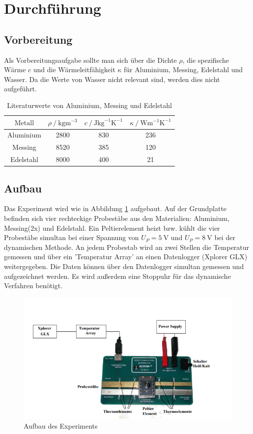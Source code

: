 \section{Durchführung}
\label{sec:Durchführung}
\subsection{Vorbereitung}
Als Vorbereitungsaufgabe sollte man sich über die Dichte $\rho$, die spezifische Wärme $c$ und die Wärmeleitfähigkeit $\kappa$ für 
Aluminium, Messing, Edelstahl und Wasser. Da die Werte von Wasser nicht relevant sind, werden dies nicht aufgeführt.
\begin{table}
    \centering
    \caption{Literaturwerte von Aluminium, Messing und Edelstahl}
    \label{tab:litwerte}
    \begin{tabular}{c c c c}
        \toprule
        $\text{Metall}$ & $\rho \mathbin{/} \si{\kilogram\meter\tothe{-3}}$ 
        & $c \mathbin{/} \si{\joule\kilogram\tothe{-1}\kelvin\tothe{-1}}$ & $\kappa \mathbin{/} \si{\watt\meter\tothe{-1}\kelvin\tothe{-1}}$\\
        \midrule
        Aluminium & 2800 & 830 & 236 \\
        Messing   & 8520 & 385 & 120 \\
        Edelstahl & 8000 & 400 & 21  \\
        \bottomrule
    \end{tabular}
\end{table}
\subsection{Aufbau}
Das Experiment wird wie in Abbildung \ref{fig:aufbau} aufgebaut. Auf der Grundplatte befinden sich vier rechteckige Probestäbe aus den Materialien:
Aluminium, Messing(2x) und Edelstahl. Ein Peltierelement heizt bzw. kühlt die vier Probestäbe simultan bei einer Spannung von $U_P=\SI{5}{\volt}$
und $U_P=\SI{8}{\volt}$ bei der dynamischen Methode. An jedem Probestab wird an zwei Stellen die Temperatur gemessen und über ein 'Temperatur Array'
an einen Datenlogger (Xplorer GLX) weitergegeben. Die Daten können über den Datenlogger simultan gemessen und aufgezeichnet werden. 
Es wird außerdem eine Stoppuhr für das dynamische Verfahren benötigt.
\begin{figure}
    \centering
    \includegraphics[scale=0.7]{Aufbau.pdf}
    \caption{Aufbau des Experiments}
    \label{fig:aufbau}
\end{figure}
